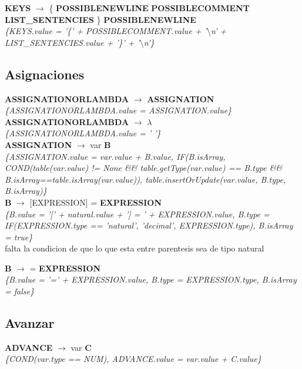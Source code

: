 \documentclass[10pt,a4paper]{article}
\begin{document}
\textbf{KEYS} $\rightarrow$ \{  \textbf{POSSIBLENEWLINE} \textbf{POSSIBLECOMMENT} \textbf{LIST\_SENTENCIES} \} \textbf{POSSIBLENEWLINE}  \\
\textit{\{KEYS.value = '\{' + POSSIBLECOMMENT.value + '$\setminus$n' + LIST\_SENTENCIES.value + '\}' + '$\setminus$n'\}} \\

\subsection{Asignaciones}


\textbf{ASSIGNATIONORLAMBDA} $\rightarrow$ \textbf{ASSIGNATION} \\
\textit{\{ASSIGNATIONORLAMBDA.value = ASSIGNATION.value\}} \\

\textbf{ASSIGNATIONORLAMBDA} $\rightarrow$ $\lambda$ \\
\textit{\{ASSIGNATIONORLAMBDA.value = ' '\}} \\

\textbf{ASSIGNATION} $\rightarrow$ var \textbf{B} \\
\textit{\{ASSIGNATION.value = var.value + B.value, 
IF(B.isArray, COND(table(var.value) != None \&\& table.getType(var.value) == B.type \&\& B.isArray==table.isArray(var.value)), table.insertOrUpdate(var.value, B.type, B.isArray)\}} \\

\textbf{B} $\rightarrow$ [EXPRESSION] = \textbf{EXPRESSION}  \\
\textit{\{B.value = '[' + natural.value + '] = ' + EXPRESSION.value, B.type = IF(EXPRESSION.type == 'natural', 'decimal', EXPRESSION.type), B.isArray = true\}} \\
falta la condicion de que lo que esta entre parentesis sea de tipo natural 


\textbf{B} $\rightarrow$ = \textbf{EXPRESSION} \\
\textit{\{B.value = '=' + EXPRESSION.value, B.type = EXPRESSION.type, B.isArray = false\}} \\

\subsection{Avanzar}
\textbf{ADVANCE} $\rightarrow$ var \textbf{C} \\
\textit{\{COND(var.type == NUM), ADVANCE.value = var.value + C.value\}} \\
\end{document}
